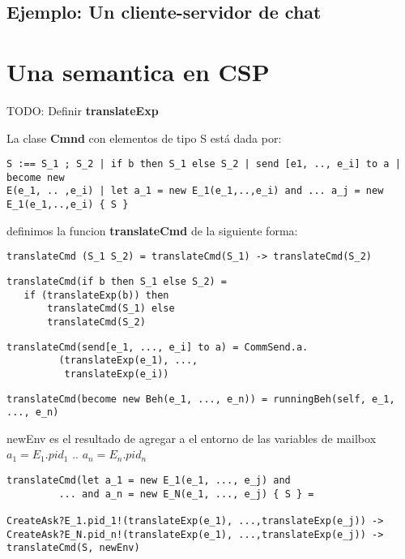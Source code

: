 \begin{description}
 \item  
\end{description}



\subsection{Ejemplo: Un cliente-servidor de chat}


\section{Una semantica en CSP}

TODO: Definir \textbf{translateExp}

La clase \textbf{Cmnd} con elementos de tipo S está dada por:

\begin{verbatim}
S :== S_1 ; S_2 | if b then S_1 else S_2 | send [e1, .., e_i] to a | become new
E(e_1, .. ,e_i) | let a_1 = new E_1(e_1,..,e_i) and ... a_j = new
E_1(e_1,..,e_i) { S } 
\end{verbatim}

definimos la funcion \textbf{translateCmd} de la siguiente forma:

\begin{verbatim}
translateCmd (S_1 S_2) = translateCmd(S_1) -> translateCmd(S_2)
\end{verbatim}


\begin{verbatim}
translateCmd(if b then S_1 else S_2) = 
   if (translateExp(b)) then
       translateCmd(S_1) else 
       translateCmd(S_2)
\end{verbatim}

\begin{verbatim}
translateCmd(send[e_1, ..., e_i] to a) = CommSend.a.
         (translateExp(e_1), ..., 
          translateExp(e_i)) 
\end{verbatim}

\begin{verbatim}
translateCmd(become new Beh(e_1, ..., e_n)) = runningBeh(self, e_1, ..., e_n)
\end{verbatim}

newEnv es el resultado de agregar a el entorno de las variables de mailbox $a_1
= E_1.pid_1$ .. $a_n = E_n.pid_n$
\begin{verbatim}
translateCmd(let a_1 = new E_1(e_1, ..., e_j) and 
         ... and a_n = new E_N(e_1, ..., e_j) { S } = 

CreateAsk?E_1.pid_1!(translateExp(e_1), ...,translateExp(e_j)) ->
CreateAsk?E_N.pid_n!(translateExp(e_1), ...,translateExp(e_j)) ->
translateCmd(S, newEnv)
\end{verbatim}



